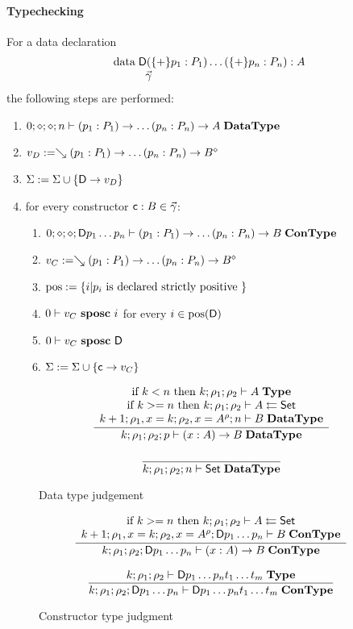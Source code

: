 \paragraph*{Typechecking}
For a data declaration  
\[\begin{array}{l}
\data \DD (\{+\} p_1 : P_1) \ldots (\{+\} p_n : P_n) : A \\
\spcx \vec{\gamma}
\end{array}
\]
the following steps are performed:
\begin{enumerate}
\item
$0;\diamond;\diamond;n\vdash(p_1 : P_1) \rightarrow \ldots (p_n : P_n) \rightarrow A\;\mathbf{DataType}$
\item
$v_D := \searrow (p_1 : P_1) \rightarrow \ldots (p_n : P_n) \rightarrow B^{\diamond}$
\item
$\mathrm{\Sigma} := \mathrm{\Sigma} \cup \{\mathsf{D} \rightarrow v_D\}$
\item
for every constructor $\mathsf{c} : B  \in \vec{\gamma}$:
\begin{enumerate} 
\item
$0;\diamond;\diamond;\mathsf{D} p_1 \ldots p_n\vdash(p_1 : P_1) \rightarrow \ldots (p_n : P_n) \rightarrow B\;\mathbf{ConType}$
\item
$v_C := \searrow (p_1 : P_1) \rightarrow \ldots (p_n : P_n) \rightarrow B^{\diamond}$
\item
$\mbox{pos} := \{ i | p_i \mbox{ is declared strictly positive } \} $ 
\item
$0\vdash v_C\mbox{ \textbf{sposc} }i$ for every $i \in \mbox{pos}(\mathsf{D}) $ 
\item
$0\vdash v_C\mbox{ \textbf{sposc} }\mathsf{D}$
\item
$\mathrm{\Sigma} := \mathrm{\Sigma} \cup \{\mathsf{c} \rightarrow v_C\}$
\end{enumerate}
\end{enumerate}

\newcommand{\nocc}[3]{#1\vdash#2\mbox{ \textbf{nocc} }#3}

\begin{figure}
\begin{gather*}
\ \dfrac{\begin{array}[b]{c}\mbox {if } k < n \mbox{ then } k;\rho_1;\rho_2\vdash A\;\mathbf{Type}\\\mbox {if } k >= n \mbox { then } k;\rho_1;\rho_2\vdash A\leftleftarrows\mathsf{Set}\\k+1;\rho_1,x=k;\rho_2,x=A^{\rho};n\vdash B\;\mathbf{DataType}\end{array}}{k;\rho_1;\rho_2;p\vdash( x : A ) \rightarrow{B}\;\mathbf{DataType}}
\\[2ex]
\ \dfrac{}{k;\rho_1;\rho_2;n\vdash\mathsf{Set}\;\mathbf{DataType}}
\end{gather*}
\caption{Data type judgement}
\end{figure}

\begin{figure}
\begin{gather*}
\ \dfrac{\begin{array}[b]{c}\mbox {if } k >= n \mbox { then } k;\rho_1;\rho_2\vdash A\leftleftarrows\mathsf{Set}\\k+1;\rho_1,x=k;\rho_2,x=A^{\rho};\mathsf{D} p_1 \ldots p_n\vdash B\;\mathbf{ConType}\end{array}}{k;\rho_1;\rho_2;\mathsf{D} p_1 \ldots p_n\vdash( x : A ) \rightarrow{B}\;\mathbf{ConType}}
\\[2ex]
\ \dfrac{k;\rho_1;\rho_2\vdash\mathsf{D} p_1 \ldots p_n t_1 \ldots t_m\;\mathbf{Type}}{k;\rho_1;\rho_2;\mathsf{D} p_1 \ldots p_n\vdash\mathsf{D} p_1 \ldots p_n t_1 \ldots t_m\;\mathbf{ConType}}
\end{gather*}
\caption{Constructor type judgment}
\end{figure}


